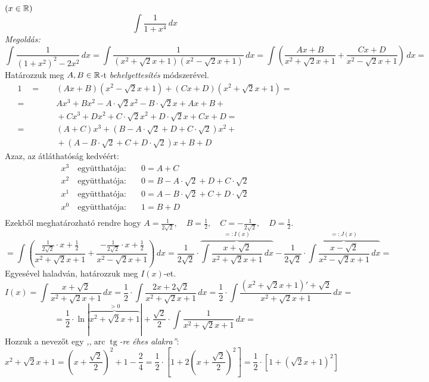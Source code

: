 \documentclass[a4paper,11.5pt]{article}
\DeclareMathOperator{\tg}{tg}
\DeclareMathOperator{\arc}{arc}
\begin{document}
	\begin{exercise}$(x\in\mathbb{R})$
		\[ \int\frac{1}{1+x^4}\,dx \]
		\textit{Megoldás:} 
		\[ \int\frac{1}{(1+x^2)^2-2x^2}\,dx=\int\frac{1}{(x^2+\sqrt{2}x+1)(x^2-\sqrt{2}x+1) }\,dx=\int\left(\frac{Ax+B}{x^2+\sqrt{2}x+1}+\frac{Cx+D}{x^2-\sqrt{2}x+1}\right)\,dx= \]
		Határozzuk meg $A,B\in\mathbb{R}$-t \textit{behelyettesítés} módszerével.
		\begin{align*}
			1 \quad =&\quad (Ax+B)(x^2-\sqrt{2}x+1)+(Cx+D)(x^2+\sqrt{2}x+1)=\\
					=&\quad Ax^3+Bx^2-A\cdot\sqrt{2}x^2-B\cdot\sqrt{2}x+Ax+B+\\
					&\quad +Cx^3+Dx^2+C\cdot\sqrt{2}x^2+D\cdot\sqrt{2}x+Cx+D=\\ 
					=&\quad (A+C)x^3+(B-A\cdot\sqrt{2}+D+C\cdot\sqrt{2})x^2+\\
					&\quad +(A-B\cdot\sqrt{2}+C+D\cdot\sqrt{2})x+B+D
 		\end{align*}
 		Azaz, az átláthatóság kedvéért:
 		\begin{align*}
	 		x^3 \quad \text{együtthatója:}&\quad  0=A+C\\
	 		x^2 \quad \text{együtthatója:}&\quad  0=B-A\cdot\sqrt{2}+D+C\cdot\sqrt{2}\\
	 		x^1 \quad \text{együtthatója:}&\quad  0=A-B\cdot\sqrt{2}+C+D\cdot\sqrt{2}\\
	 		x^0 \quad \text{együtthatója:}&\quad  1=B+D\\
 		\end{align*}
 		Ezekből meghatározható rendre hogy $A=\frac{1}{2\sqrt{2}},\quad B=\frac{1}{2},\quad C=-\frac{1}{2\sqrt{2}},\quad D=\frac{1}{2}$.
 		\[=\int\left(\frac{\frac{1}{2\sqrt{2}}\cdot x+\frac{1}{2}}{x^2+\sqrt{2}x+1}+\frac{-\frac{1}{2\sqrt{2}}\cdot x+\frac{1}{2}}{x^2-\sqrt{2}x+1}\right)\,dx=\frac{1}{2\sqrt{2}}\cdot\overbrace{\int\frac{x+\sqrt{2}}{x^2+\sqrt{2}x+1}\,dx}^{=:I(x)}-\frac{1}{2\sqrt{2}}\cdot\overbrace{\int\frac{x-\sqrt{2}}{x^2-\sqrt{2}x+1}\,dx}^{=:J(x)}= \]
 		Egyesével haladván, határozzuk meg $I(x)$-et.
 		\[ I(x)=\int\frac{x+\sqrt{2}}{x^2+\sqrt{2}x+1}\,dx=\frac{1}{2}\cdot\int\frac{2x+2\sqrt{2}}{x^2+\sqrt{2}x+1}\,dx=\frac{1}{2}\cdot\int\frac{(x^2+\sqrt{2}x+1)'+\sqrt{2}}{x^2+\sqrt{2}x+1}\,dx=\]
 		\[=\frac{1}{2}\cdot\ln|\overbrace{x^2+\sqrt{2}x+1}^{>0}|+\frac{\sqrt{2}}{2}\cdot\int\frac{1}{x^2+\sqrt{2}x+1}\,dx= \]
 		Hozzuk a nevezőt egy \textit{,,$\arc\tg$-re éhes alakra''}:
 		\[ x^2+\sqrt{2}x+1=\left(x+\frac{\sqrt{2}}{2}\right)^2+1-\frac{2}{4}=\frac{1}{2}\cdot\left[1+2\left(x+\frac{\sqrt{2}}{2}\right)^2\right]=\frac{1}{2}\cdot\left[1+\left(\sqrt{2}x+1\right)^2\right] \]

\end{exercise}
\end{document}
